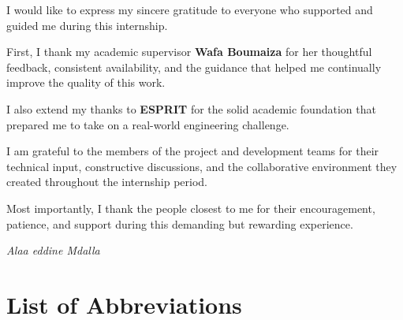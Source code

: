 \documentclass[12pt,a4paper]{report}
\begin{document}
\begin{minipage}{0.88\textwidth}

I would like to express my sincere gratitude to everyone who supported and guided
me during this internship.

\medskip
First, I thank my academic supervisor \textbf{Wafa Boumaiza} for her thoughtful
feedback, consistent availability, and the guidance that helped me continually
improve the quality of this work.

\medskip
I also extend my thanks to \textbf{ESPRIT} for the solid academic foundation that
prepared me to take on a real-world engineering challenge.

\medskip
I am grateful to the members of the project and development teams for their
technical input, constructive discussions, and the collaborative environment they
created throughout the internship period.

\medskip
Most importantly, I thank the people closest to me for their encouragement,
patience, and support during this demanding but rewarding experience.

\end{minipage}

\vspace{1.5cm}
\begin{flushright}
\itshape Alaa eddine Mdalla
\end{flushright}

\newpage
\tableofcontents

\newpage
{}
\listoffigures

\newpage
{}
\listoftables

\newpage

\chapter*{List of Abbreviations}
\end{document}
